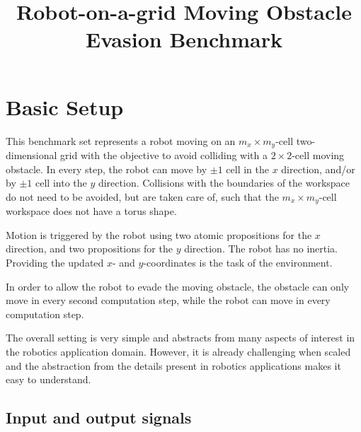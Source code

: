 \documentclass[a4paper,conference,10pt]{IEEEtran}
\author{\IEEEauthorblockN{R\"udiger Ehlers}
\IEEEauthorblockA{University of Bremen\\
Germany
}}
\begin{document}
\title{Robot-on-a-grid Moving Obstacle Evasion Benchmark}
\maketitle

\section{Basic Setup}

This benchmark set represents a robot moving on an $m_x \times m_y$-cell two-dimensional grid with the objective to avoid colliding with a $2 \times 2$-cell moving obstacle. In every step, the robot can move by $\pm 1$ cell in the $x$ direction, and/or by $\pm 1$ cell into the $y$ direction. Collisions with the boundaries of the workspace do not need to be avoided, but are taken care of, such that the $m_x \times m_y$-cell workspace does not have a torus shape.

Motion is triggered by the robot using two atomic propositions for the $x$ direction, and two propositions for the $y$ direction. The robot has no inertia. Providing the updated $x$- and $y$-coordinates is the task of the environment.

In order to allow the robot to evade the moving obstacle, the obstacle can only move in every second computation step, while the robot can move in every computation step.

The overall setting is very simple and abstracts from many aspects of interest in the robotics application domain. However, it is already challenging when scaled and the abstraction from the details present in robotics applications makes it easy to understand.

\subsection{Input and output signals}
\end{document}
